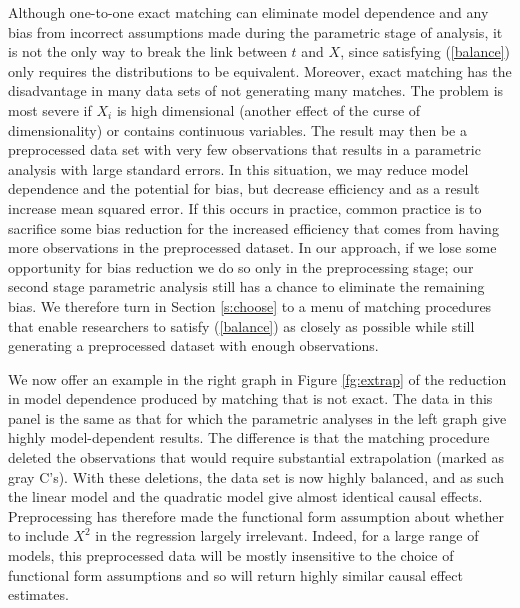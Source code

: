 \documentclass[11pt,titlepage]{article}
\begin{document}
Although one-to-one exact matching can eliminate model dependence and
any bias from incorrect assumptions made during the parametric stage
of analysis, it is not the only way to break the link between $t$ and
$X$, since satisfying (\ref{balance}) only requires the distributions
to be equivalent.  Moreover, exact matching has the disadvantage in
many data sets of not generating many matches.  The problem is most
severe if $X_i$ is high dimensional (another effect of the curse of
dimensionality) or contains continuous variables.  The result may then
be a preprocessed data set with very few observations that results in
a parametric analysis with large standard errors.  In this situation,
we may reduce model dependence and the potential for bias, but
decrease efficiency and as a result increase mean squared error.  If
this occurs in practice, common practice is to sacrifice some bias
reduction for the increased efficiency that comes from having more
observations in the preprocessed dataset.  In our approach, if we lose
some opportunity for bias reduction we do so only in the preprocessing
stage; our second stage parametric analysis still has a chance to
eliminate the remaining bias.  We therefore turn in Section
\ref{s:choose} to a menu of matching procedures that enable
researchers to satisfy (\ref{balance}) as closely as possible while
still generating a preprocessed dataset with enough observations.

We now offer an example in the right graph in Figure \ref{fg:extrap}
of the reduction in model dependence produced by matching that is not
exact.  The data in this panel is the same as that for which the
parametric analyses in the left graph give highly model-dependent
results.  The difference is that the matching procedure deleted the
observations that would require substantial extrapolation (marked as
gray C's).  With these deletions, the data set is now highly balanced,
and as such the linear model and the quadratic model give almost
identical causal effects.  Preprocessing has therefore made the
functional form assumption about whether to include $X^2$ in the
regression largely irrelevant.  Indeed, for a large range of models,
this preprocessed data will be mostly insensitive to the choice of
functional form assumptions and so will return highly similar causal
effect estimates.
\end{document}
